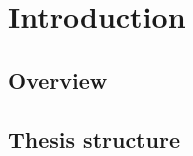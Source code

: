 \setcounter{chapter}{-1}
\chapter{Introduction}
%
\section{Overview}
%
%
%
\section{Thesis structure}
